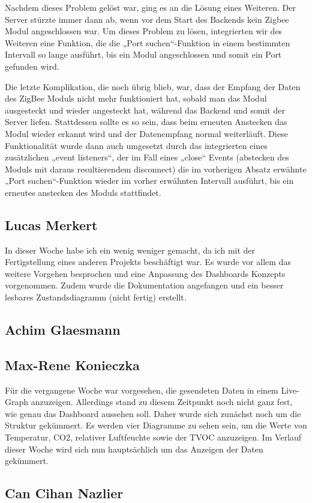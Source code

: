 \documentclass[]{article}
\begin{document}
Nachdem dieses Problem gelöst war, ging es an die Lösung eines Weiteren. Der Server stürzte immer dann ab, wenn vor dem Start des Backends kein Zigbee Modul angeschlossen war. Um dieses Problem zu lösen, integrierten wir des Weiteren eine Funktion, die die „Port suchen“-Funktion in einem bestimmten Intervall so lange ausführt, bis ein Modul angeschlossen und somit ein Port gefunden wird.

Die letzte Komplikation, die noch übrig blieb, war, dass der Empfang der Daten des ZigBee Moduls nicht mehr funktioniert hat, sobald man das Modul ausgesteckt und wieder angesteckt hat, während das Backend und somit der Server liefen. Stattdessen sollte es so sein, dass beim erneuten Anstecken das Modul wieder erkannt wird und der Datenempfang normal weiterläuft. Diese Funktionalität wurde dann auch umgesetzt durch das integrierten eines zusätzlichen „event listeners“, der im Fall eines „close“ Events (abstecken des Moduls mit daraus resultierendem disconnect) die im vorherigen Absatz erwähnte „Port suchen“-Funktion wieder im vorher erwähnten Intervall ausführt, bis ein erneutes anstecken des Moduls stattfindet.


\subsection{Lucas Merkert}
In dieser Woche habe ich ein wenig weniger gemacht, da ich mit der Fertigstellung eines anderen Projekts beschäftigt war. Es wurde vor allem das weitere Vorgehen besprochen und eine Anpassung des Dashboards Konzepts vorgenommen. Zudem wurde die Dokumentation angefangen und ein besser lesbares Zustandsdiagramm (nicht fertig) erstellt.

\subsection{Achim Glaesmann}


\subsection{Max-Rene Konieczka}
Für die vergangene Woche war vorgesehen, die gesendeten Daten in einem Live-Graph anzuzeigen. Allerdings stand zu diesem Zeitpunkt noch nicht ganz fest, wie genau das Dashboard aussehen soll. Daher wurde sich zunächst noch um die Struktur gekümmert. Es werden vier Diagramme zu sehen sein, um die Werte von Temperatur, CO2, relativer Luftfeuchte sowie der TVOC anzuzeigen. Im Verlauf dieser Woche wird sich nun hauptsächlich um das Anzeigen der Daten gekümmert. 

\subsection{Can Cihan Nazlier}

\end{document}
